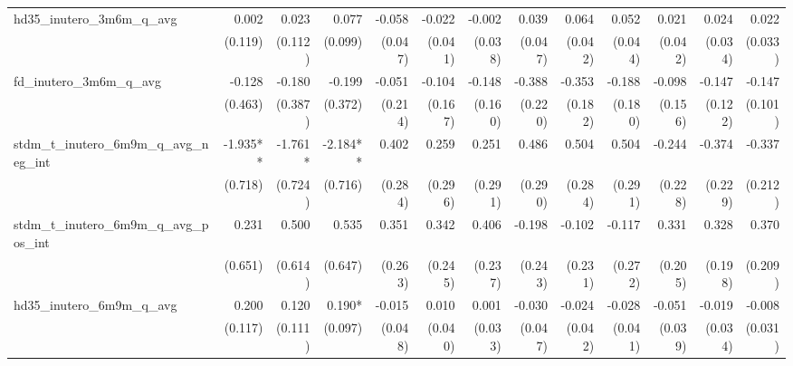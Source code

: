 \begin{tabular}{lrrrrrrrrrrrr}
hd35\_inutero\_3m6m\_q\_avg                 &        0.002 &        0.023 &        0.077 &       -0.058 &       -0.022 &       -0.002 &        0.039 &        0.064 &        0.052 &        0.021 &        0.024 &        0.022 \\ 
                                            &      (0.119) &      (0.112) &      (0.099) &      (0.047) &      (0.041) &      (0.038) &      (0.047) &      (0.042) &      (0.044) &      (0.042) &      (0.034) &      (0.033) \\ 
fd\_inutero\_3m6m\_q\_avg                   &       -0.128 &       -0.180 &       -0.199 &       -0.051 &       -0.104 &       -0.148 &       -0.388 &       -0.353 &       -0.188 &       -0.098 &       -0.147 &       -0.147 \\ 
                                            &      (0.463) &      (0.387) &      (0.372) &      (0.214) &      (0.167) &      (0.160) &      (0.220) &      (0.182) &      (0.180) &      (0.156) &      (0.122) &      (0.101) \\ 
stdm\_t\_inutero\_6m9m\_q\_avg\_neg\_int    &     -1.935** &      -1.761* &     -2.184** &        0.402 &        0.259 &        0.251 &        0.486 &        0.504 &        0.504 &       -0.244 &       -0.374 &       -0.337 \\ 
                                            &      (0.718) &      (0.724) &      (0.716) &      (0.284) &      (0.296) &      (0.291) &      (0.290) &      (0.284) &      (0.291) &      (0.228) &      (0.229) &      (0.212) \\ 
stdm\_t\_inutero\_6m9m\_q\_avg\_pos\_int    &        0.231 &        0.500 &        0.535 &        0.351 &        0.342 &        0.406 &       -0.198 &       -0.102 &       -0.117 &        0.331 &        0.328 &        0.370 \\ 
                                            &      (0.651) &      (0.614) &      (0.647) &      (0.263) &      (0.245) &      (0.237) &      (0.243) &      (0.231) &      (0.272) &      (0.205) &      (0.198) &      (0.209) \\ 
hd35\_inutero\_6m9m\_q\_avg                 &        0.200 &        0.120 &       0.190* &       -0.015 &        0.010 &        0.001 &       -0.030 &       -0.024 &       -0.028 &       -0.051 &       -0.019 &       -0.008 \\ 
                                            &      (0.117) &      (0.111) &      (0.097) &      (0.048) &      (0.040) &      (0.033) &      (0.047) &      (0.042) &      (0.041) &      (0.039) &      (0.034) &      (0.031) \\ 

\end{tabular}
